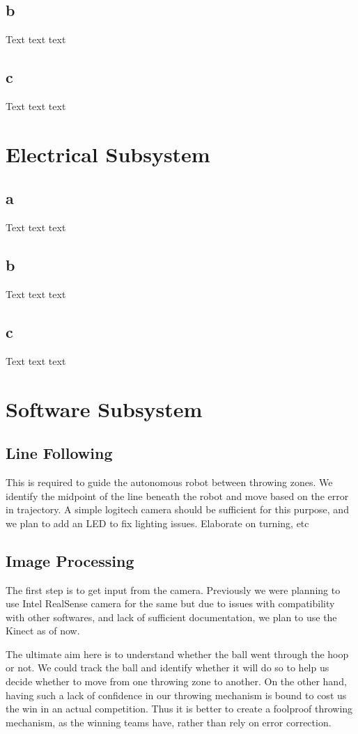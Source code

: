 \documentclass[11pt]{article}
\begin{document}
\subsection{b}
Text text text
\subsection{c}
Text text text

\pagebreak
\section{Electrical Subsystem}
\subsection{a}
Text text text
\subsection{b}
Text text text
\subsection{c}
Text text text

\pagebreak
\section{Software Subsystem}
\subsection{Line Following}
This is required to guide the autonomous robot between throwing zones. We identify the midpoint of the line beneath the robot and move based on the error in trajectory. A simple logitech camera should be sufficient for this purpose, and we plan to add an LED to fix lighting issues. Elaborate on turning, etc

\subsection{Image Processing}
The first step is to get input from the camera. Previously we were planning to use Intel RealSense camera for the same but due to issues with compatibility with other softwares, and lack of sufficient documentation, we plan to use the Kinect as of now.

The ultimate aim here is to understand whether the ball went through the hoop or not. We could track the ball and identify whether it will do so to help us decide whether to move from one throwing zone to another. On the other hand, having such a lack of confidence in our throwing mechanism is bound to cost us the win in an actual competition. Thus it is better to create a foolproof throwing mechanism, as the winning teams have, rather than rely on error correction.
\end{document}
